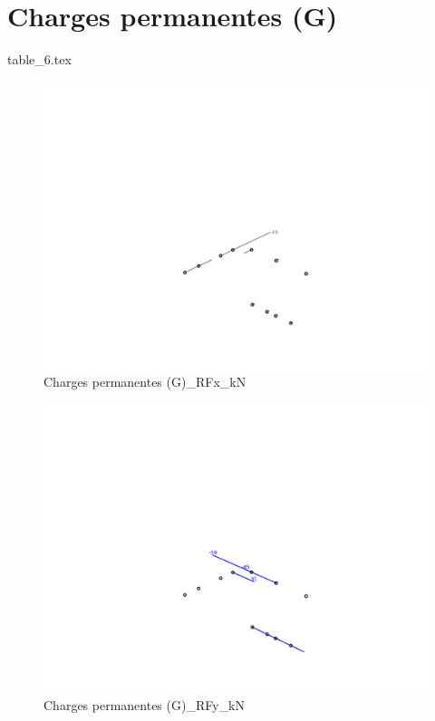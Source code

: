 
    \section{Charges permanentes (G)}
    {table_6.tex}

    \begin{figure}[H] %
        \centering %
        \includegraphics[width=\textwidth]{assets/img/graph3D_charges_cas_6_RFx_kN.png} %
        \caption{Charges permanentes (G)\_RFx\_kN} %
    \end{figure}

    \begin{figure}[H] %
        \centering %
        \includegraphics[width=\textwidth]{assets/img/graph3D_charges_cas_6_RFy_kN.png} %
        \caption{Charges permanentes (G)\_RFy\_kN} %
    \end{figure}

